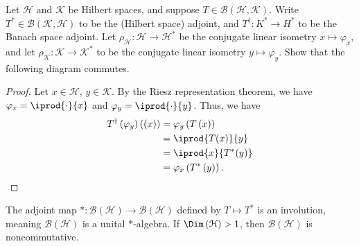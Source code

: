 \documentclass[10pt]{mypackage}
\begin{document}
\begin{exercise}
  Let $\mathcal{H}$ and $\mathcal{K}$ be Hilbert spaces, and suppose $T\in \mathcal{B}\left(\mathcal{H},\mathcal{K}\right)$. Write $T^{\ast}\in \mathcal{B}\left(\mathcal{K},\mathcal{H}\right)$ to be the (Hilbert space) adjoint, and $T^{\dagger}: K^{\ast}\rightarrow H^{\ast}$ to be the Banach space adjoint. Let $\rho_{\mathcal{H}}:\mathcal{H}\rightarrow \mathcal{H}^{\ast}$ be the conjugate linear isometry $x\mapsto \varphi_x$, and let $\rho_{\mathcal{K}}: \mathcal{K}\rightarrow \mathcal{K}^{\ast}$ to be the conjugate linear isometry $y \mapsto \varphi_{y}$. Show that the following diagram commutes.
  \begin{center}
  \end{center}
\end{exercise}
\begin{proof}
  Let $x\in \mathcal{H}$, $y\in \mathcal{K}$. By the Riesz representation theorem, we have $\varphi_{x} = \iprod{\cdot}{x}$ and $\varphi_{y} = \iprod{\cdot}{y}$. Thus, we have
  \begin{align*}
    T^{\dagger}\left(\varphi_y\right)\left(\left(x\right)\right) &= \varphi_{y}\left(T\left(x\right)\right)\\
                                                                 &= \iprod{T(x)}{y}\\
                                                                 &= \iprod{x}{T^{\ast}(y)}\\
                                                                 &= \varphi_{x}\left(T^{\ast}\left(y\right)\right).
  \end{align*}
  
\end{proof}
\begin{corollary}
  The adjoint map $\ast: \mathcal{B}\left(\mathcal{H}\right)\rightarrow \mathcal{B}\left(\mathcal{H}\right)$ defined by $T\mapsto T^{\ast}$ is an involution, meaning $\mathcal{B}\left(\mathcal{H}\right)$ is a unital $\ast$-algebra. If $\Dim\left(\mathcal{H}\right) > 1$, then $\mathcal{B}\left(\mathcal{H}\right)$ is noncommutative.
\end{corollary}
\end{document}
